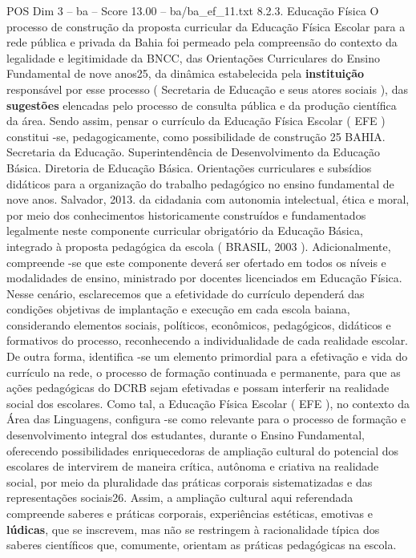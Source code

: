 \begin{textsample}{POS Dim 3 – ba – Score 13.00 – ba/ba\_ef\_11.txt}  \label{ex:f3_pos_180}
8.2.3.
Educação Física O processo de construção da proposta curricular da Educação Física Escolar para a rede pública e privada da Bahia foi permeado pela compreensão do contexto da legalidade e legitimidade da BNCC, das Orientações Curriculares do Ensino Fundamental de nove anos25, da dinâmica estabelecida pela \textbf{instituição} responsável por esse processo ( Secretaria de Educação e seus atores sociais ), das \textbf{sugestões} elencadas pelo processo de consulta pública e da produção científica da área.
Sendo assim, pensar o currículo da Educação Física Escolar ( EFE ) constitui -se, pedagogicamente, como possibilidade de construção 25 BAHIA.
Secretaria da Educação.
Superintendência de Desenvolvimento da Educação Básica.
Diretoria de Educação Básica.
Orientações curriculares e subsídios didáticos para a organização do trabalho pedagógico no ensino fundamental de nove anos.
Salvador, 2013. da cidadania com autonomia intelectual, ética e moral, por meio dos conhecimentos historicamente construídos e fundamentados legalmente neste componente curricular obrigatório da Educação Básica, integrado à proposta pedagógica da escola ( BRASIL, 2003 ).
Adicionalmente, compreende -se que este componente deverá ser ofertado em todos os níveis e modalidades de ensino, ministrado por docentes licenciados em Educação Física.
Nesse cenário, esclarecemos que a efetividade do currículo dependerá das condições objetivas de implantação e execução em cada escola baiana, considerando elementos sociais, políticos, econômicos, pedagógicos, didáticos e formativos do processo, reconhecendo a individualidade de cada realidade escolar.
De outra forma, identifica -se um elemento primordial para a efetivação e vida do currículo na rede, o processo de formação continuada e permanente, para que as ações pedagógicas do DCRB sejam efetivadas e possam interferir na realidade social dos escolares.
Como tal, a Educação Física Escolar ( EFE ), no contexto da Área das Linguagens, configura -se como relevante para o processo de formação e desenvolvimento integral dos estudantes, durante o Ensino Fundamental, oferecendo possibilidades enriquecedoras de ampliação cultural do potencial dos escolares de intervirem de maneira crítica, autônoma e criativa na realidade social, por meio da pluralidade das práticas corporais sistematizadas e das representações sociais26.
Assim, a ampliação cultural aqui referendada compreende saberes e práticas corporais, experiências estéticas, emotivas e \textbf{lúdicas}, que se inscrevem, mas não se restringem à racionalidade típica dos saberes científicos que, comumente, orientam as práticas pedagógicas na escola.

\end{textsample}

